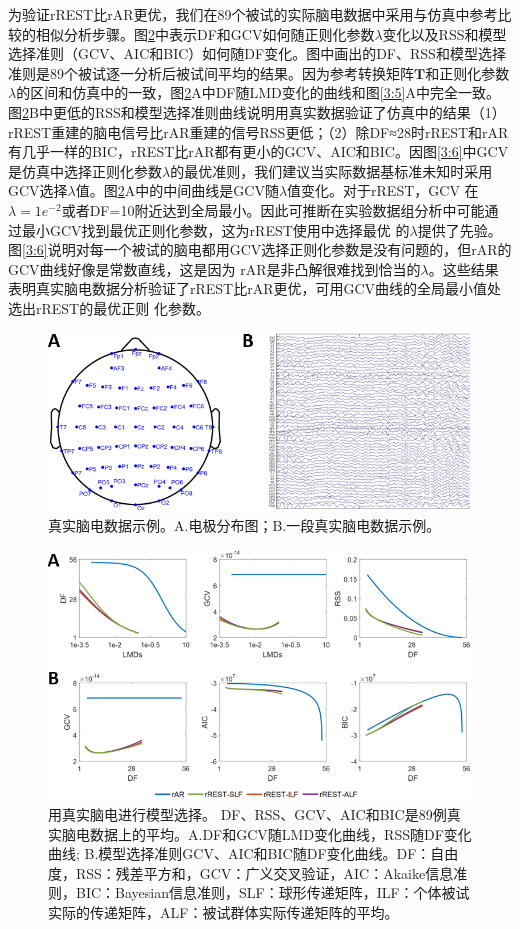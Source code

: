 为验证rREST比rAR更优，我们在89个被试的实际脑电数据中采用与仿真中参考比较的相似分析步骤。图\ref{3:8}中表示DF和GCV如何随正则化参数$\lambda$变化以及RSS和模型选择准则（GCV、AIC和BIC）如何随DF变化。图中画出的DF、RSS和模型选择准则是89个被试逐一分析后被试间平均的结果。因为参考转换矩阵$\mathbf{T}$和正则化参数$\lambda$的区间和仿真中的一致，图\ref{3:8}A中DF随LMD变化的曲线和图\ref{3:5}A中完全一致。图\ref{3:8}B中更低的RSS和模型选择准则曲线说明用真实数据验证了仿真中的结果（1）rREST重建的脑电信号比rAR重建的信号RSS更低；（2）除DF≈28时rREST和rAR有几乎一样的BIC，rREST比rAR都有更小的GCV、AIC和BIC。因图\ref{3:6}中GCV是仿真中选择正则化参数$\lambda$的最优准则，我们建议当实际数据基标准未知时采用GCV选择$\lambda$值。图\ref{3:8}A中的中间曲线是GCV随$\lambda$值变化。对于rREST，GCV
在$\lambda=1e^{-2}$或者DF=10附近达到全局最小。因此可推断在实验数据组分析中可能通过最小GCV找到最优正则化参数，这为rREST使用中选择最优
的$\lambda$提供了先验。图\ref{3:6}说明对每一个被试的脑电都用GCV选择正则化参数是没有问题的，但rAR的GCV曲线好像是常数直线，这是因为
rAR是非凸解很难找到恰当的$\lambda$。这些结果表明真实脑电数据分析验证了rREST比rAR更优，可用GCV曲线的全局最小值处选出rREST的最优正则
化参数。
\begin{figure}[!h]
	\centering
	\includegraphics[width=15cm]{pic/Frontier/figure7.png}
	\caption{真实脑电数据示例。A.电极分布图；B.一段真实脑电数据示例。}
	\label{3:7}
\end{figure}
\begin{figure}[!h]
	\centering
	\includegraphics[width=15cm]{pic/Frontier/figure8.png}
	\caption{用真实脑电进行模型选择。 DF、RSS、GCV、AIC和BIC是89例真实脑电数据上的平均。A.DF和GCV随LMD变化曲线，RSS随DF变化曲线; B.模型选择准则GCV、AIC和BIC随DF变化曲线。DF：自由度，RSS：残差平方和，GCV：广义交叉验证，AIC：Akaike信息准则，BIC：Bayesian信息准则，SLF：球形传递矩阵，ILF：个体被试实际的传递矩阵，ALF：被试群体实际传递矩阵的平均。}
	\label{3:8}
\end{figure}

